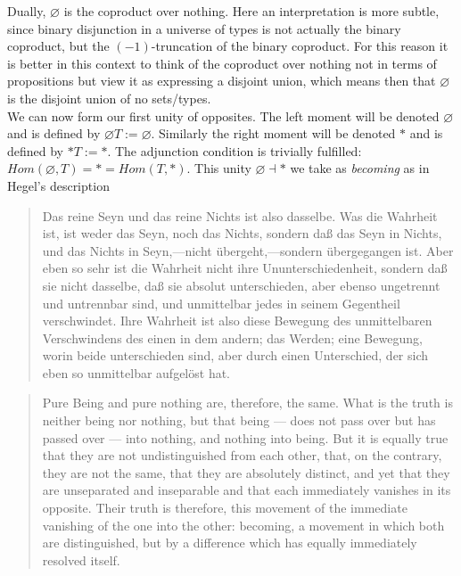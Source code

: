 \documentclass{article}
\begin{document}
 

Dually, $\varnothing$ is the coproduct over nothing. Here an interpretation is more subtle, since binary 
disjunction in a universe of types is not actually the binary coproduct, but the $(-1)$-truncation of the 
binary coproduct. For this reason it is better in this context to think of the coproduct over nothing not in 
terms of propositions but view it as expressing a disjoint union, which means then that $\varnothing$ is the 
disjoint union of no sets/types. \\

We can now form our first unity of opposites. The left moment will be denoted $\varnothing$ and is defined by
$\varnothing T:= \varnothing$. Similarly the right moment will be denoted $*$ and is defined by $* T:= *$. 
The adjunction condition is trivially fulfilled: $Hom(\varnothing, T)=*=Hom(T, *)$. This unity 
$\varnothing\dashv *$ we take as \emph{becoming} as in Hegel's description

\begin{quote}
    Das reine Seyn und das reine Nichts ist also dasselbe. Was die Wahrheit ist, ist weder das Seyn, noch das Nichts, sondern daß das Seyn in Nichts, und das Nichts in Seyn,—nicht übergeht,—sondern übergegangen ist. Aber eben so sehr ist die Wahrheit nicht ihre Ununterschiedenheit, sondern daß sie nicht dasselbe, daß sie absolut unterschieden, aber ebenso ungetrennt und untrennbar sind, und unmittelbar jedes in seinem Gegentheil verschwindet. Ihre Wahrheit ist also diese Bewegung des unmittelbaren Verschwindens des einen in dem andern; das Werden; eine Bewegung, worin beide unterschieden sind, aber durch einen Unterschied, der sich eben so unmittelbar aufgelöst hat.
\end{quote}

\begin{quote}
    Pure Being and pure nothing are, therefore, the same. What is the truth is neither being nor nothing, but that being — does not pass over but has passed over — into nothing, and nothing into being. But it is equally true that they are not undistinguished from each other, that, on the contrary, they are not the same, that they are absolutely distinct, and yet that they are unseparated and inseparable and that each immediately vanishes in its opposite. Their truth is therefore, this movement of the immediate vanishing of the one into the other: becoming, a movement in which both are distinguished, but by a difference which has equally immediately resolved itself.
\end{quote}
    
\end{document}
